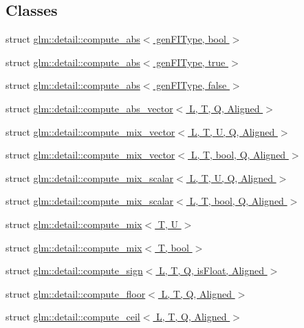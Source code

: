 \subsection*{Classes}
\begin{DoxyCompactItemize}
\item 
struct \hyperlink{structglm_1_1detail_1_1compute__abs}{glm\+::detail\+::compute\+\_\+abs$<$ gen\+F\+I\+Type, bool $>$}
\item 
struct \hyperlink{structglm_1_1detail_1_1compute__abs_3_01gen_f_i_type_00_01true_01_4}{glm\+::detail\+::compute\+\_\+abs$<$ gen\+F\+I\+Type, true $>$}
\item 
struct \hyperlink{structglm_1_1detail_1_1compute__abs_3_01gen_f_i_type_00_01false_01_4}{glm\+::detail\+::compute\+\_\+abs$<$ gen\+F\+I\+Type, false $>$}
\item 
struct \hyperlink{structglm_1_1detail_1_1compute__abs__vector}{glm\+::detail\+::compute\+\_\+abs\+\_\+vector$<$ L, T, Q, Aligned $>$}
\item 
struct \hyperlink{structglm_1_1detail_1_1compute__mix__vector}{glm\+::detail\+::compute\+\_\+mix\+\_\+vector$<$ L, T, U, Q, Aligned $>$}
\item 
struct \hyperlink{structglm_1_1detail_1_1compute__mix__vector_3_01_l_00_01_t_00_01bool_00_01_q_00_01_aligned_01_4}{glm\+::detail\+::compute\+\_\+mix\+\_\+vector$<$ L, T, bool, Q, Aligned $>$}
\item 
struct \hyperlink{structglm_1_1detail_1_1compute__mix__scalar}{glm\+::detail\+::compute\+\_\+mix\+\_\+scalar$<$ L, T, U, Q, Aligned $>$}
\item 
struct \hyperlink{structglm_1_1detail_1_1compute__mix__scalar_3_01_l_00_01_t_00_01bool_00_01_q_00_01_aligned_01_4}{glm\+::detail\+::compute\+\_\+mix\+\_\+scalar$<$ L, T, bool, Q, Aligned $>$}
\item 
struct \hyperlink{structglm_1_1detail_1_1compute__mix}{glm\+::detail\+::compute\+\_\+mix$<$ T, U $>$}
\item 
struct \hyperlink{structglm_1_1detail_1_1compute__mix_3_01_t_00_01bool_01_4}{glm\+::detail\+::compute\+\_\+mix$<$ T, bool $>$}
\item 
struct \hyperlink{structglm_1_1detail_1_1compute__sign}{glm\+::detail\+::compute\+\_\+sign$<$ L, T, Q, is\+Float, Aligned $>$}
\item 
struct \hyperlink{structglm_1_1detail_1_1compute__floor}{glm\+::detail\+::compute\+\_\+floor$<$ L, T, Q, Aligned $>$}
\item 
struct \hyperlink{structglm_1_1detail_1_1compute__ceil}{glm\+::detail\+::compute\+\_\+ceil$<$ L, T, Q, Aligned $>$}

\end{DoxyCompactItemize}

